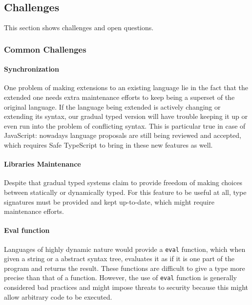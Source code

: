 % 


\subsection{Challenges}

This section shows challenges and open questions.

\subsubsection{Common Challenges}

\paragraph{Synchronization}
One problem of making extensions to an existing language
lie in the fact that the extended one needs extra maintenance efforts to keep being
a superset of the original language.
If the language being extended is actively changing or extending its syntax,
our gradual typed version will have trouble keeping it up or
even run into the problem of conflicting syntax.
This is particular true in case of JavaScript: nowadays language proposals
are still being reviewed and accepted, which requires Safe TypeScript to bring in these
new features as well.

\paragraph{Libraries Maintenance}
Despite that gradual typed systems claim to provide freedom of making choices
between statically or dynamically typed.
For this feature to be useful at all, type signatures must be provided
and kept up-to-date, which might require maintenance efforts.

\paragraph{Eval function}

Languages of highly dynamic nature would provide a \texttt{eval} function,
which when given a string or a abstract syntax tree, evaluates it as
if it is one part of the program and returns the result.
These functions are difficult to give a type more precise than that of a function.
However, the use of \texttt{eval} function is generally considered bad practices and
might impose threats to security because this might allow arbitrary code to be executed.

